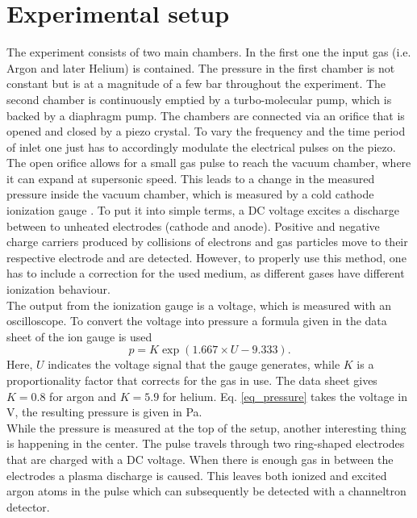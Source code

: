 \documentclass[a4paper,10pt]{article}
\begin{document}
\section{Experimental setup}
The experiment consists of two main chambers. In the first one the input gas (i.e. Argon and later Helium) is contained. The pressure in the first chamber is not constant but is at a magnitude of a few \si{\bar} throughout the experiment. The second chamber is continuously emptied by a turbo-molecular pump, which is backed by a diaphragm pump. The chambers are connected via an orifice that is opened and closed by a piezo crystal. To vary the frequency and the time period of inlet one just has to accordingly modulate the electrical pulses on the piezo.
\newline
The open orifice allows for a small gas pulse to reach the vacuum chamber, where it can expand at supersonic speed. This leads to a change in the measured pressure inside the vacuum chamber, which is measured by a cold cathode ionization gauge \cite{cold_cathode}. To put it into simple terms, a DC voltage excites a discharge between to unheated electrodes (cathode and anode). Positive and negative charge carriers produced by collisions of electrons and gas particles move to their respective electrode and are detected. However, to properly use this method, one has to include a correction for the used medium, as different gases have different ionization behaviour.
\\
The output from the ionization gauge is a voltage, which is measured with an oscilloscope. To convert the voltage into pressure a formula given in the data sheet of the ion gauge \cite{datasheet_pfeiffer} is used
\begin{equation}
	\label{eq_pressure}
	p = K \exp(1.667 \times U - 9.333).
\end{equation}
Here, $U$ indicates the voltage signal that the gauge generates, while $K$ is a proportionality factor that corrects for the gas in use. The data sheet gives $K= 0.8$ for argon and $K = 5.9$ for helium. Eq. \ref{eq_pressure} takes the voltage in \si{\volt}, the resulting pressure is given in \si{\pascal}.
\\
While the pressure is measured at the top of the setup, another interesting thing is happening in the center. The pulse travels through two ring-shaped electrodes that are charged with a DC voltage. When there is enough gas in between the electrodes a plasma discharge is caused. This leaves both ionized and excited argon atoms in the pulse which can subsequently be detected with a channeltron detector.\\
\end{document}
